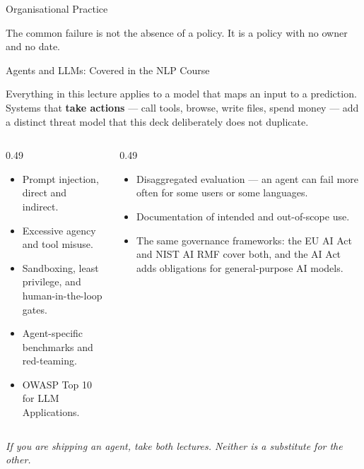 \begin{frame}{Organisational Practice}
    \vspace{0.8em}
    \begin{block}{}
        \centering
        \small The common failure is not the absence of a policy. It is a policy with no owner and
        no date.
    \end{block}
\end{frame}

\begin{frame}{Agents and LLMs: Covered in the NLP Course}

    Everything in this lecture applies to a model that maps an input to a prediction. Systems that
    \textbf{take actions} --- call tools, browse, write files, spend money --- add a distinct threat
    model that this deck deliberately does not duplicate.

    \vspace{0.9em}

    \begin{columns}[T]
        \begin{column}{0.49\textwidth}
            \begin{tcolorbox}[colback=gray!8, colframe=gray!60,
                              title={NLP course: AI Safety for Agents}]
                \scriptsize
                \begin{itemize}
                    \item Prompt injection, direct and indirect.
                    \item Excessive agency and tool misuse.
                    \item Sandboxing, least privilege, and human-in-the-loop gates.
                    \item Agent-specific benchmarks and red-teaming.
                    \item OWASP Top 10 for LLM Applications.
                \end{itemize}
            \end{tcolorbox}
        \end{column}
        \begin{column}{0.49\textwidth}
            \begin{tcolorbox}[colback=raiBlue!5, colframe=raiBlue!60, title=What carries over]
                \scriptsize
                \begin{itemize}
                    \item Disaggregated evaluation --- an agent can fail more often for some users
                          or some languages.
                    \item Documentation of intended and out-of-scope use.
                    \item The same governance frameworks: the EU AI Act and NIST AI RMF cover both,
                          and the AI Act adds obligations for general-purpose AI models.
                \end{itemize}
            \end{tcolorbox}
        \end{column}
    \end{columns}

    \vspace{0.7em}
    \centering
    \textit{If you are shipping an agent, take both lectures. Neither is a substitute for the other.}
\end{frame}
